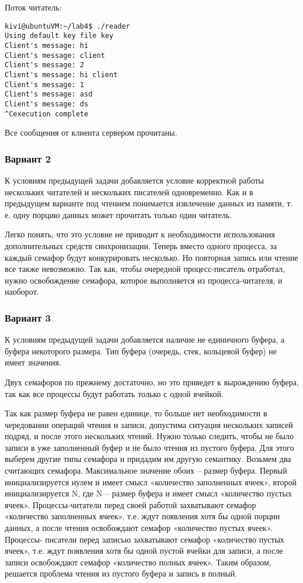 \documentclass[a4paper]{article}
\begin{document}
	Поток читатель:
	\begin{lstlisting}[style=crs_bash]
kivi@ubuntuVM:~/lab4$ ./reader 
Using default key file key
Client's message: hi
Client's message: client
Client's message: 2
Client's message: hi client
Client's message: 1
Client's message: asd
Client's message: ds
^Cexecution complete
	\end{lstlisting}
	
	Все сообщения от клиента сервером прочитаны.
	
	\subsubsection{Вариант 2}
	К условиям предыдущей задачи добавляется условие корректной работы нескольких читателей и нескольких писателей одновременно. Как и в предыдущем варианте под чтением понимается извлечение данных из памяти, т. е. одну порцию данных может прочитать только один читатель.

	Легко понять, что это условие не приводит к необходимости использования дополнительных средств синхронизации. Теперь вместо одного процесса, за каждый семафор будут конкурировать несколько. Но повторная запись или чтение все также невозможно. Так как, чтобы очередной процесс-писатель отработал, нужно освобождение семафора, которое выполняется из процесса-читателя, и наоборот.
	
	\subsubsection{Вариант 3}	
	К условиям предыдущей задачи добавляется наличие не единичного буфера, а буфера некоторого размера. Тип буфера (очередь, стек, кольцевой буфер) не имеет значения.
	
	Двух семафоров по прежнему достаточно, но это приведет к вырождению буфера, так как все процессы будут работать только с одной ячейкой.
	
	Так как размер буфера не равен единице, то больше нет необходимости в чередовании операций чтения и записи, допустима ситуация нескольких записей подряд, и после этого нескольких чтений. Нужно только следить, чтобы не было записи в уже заполненный буфер и не было чтения из пустого буфера. Для этого выберем другие типы семафора и придадим им другую семантику. Возьмем два считающих семафора. Максимальное значение обоих – размер буфера. Первый инициализируется нулем и имеет смысл «количество заполненных ячеек», второй инициализируется N, где N – размер буфера и имеет смысл «количество пустых ячеек». Процессы-читатели перед своей работой захватывают семафор «количество заполненных ячеек», т.е. ждут появления хотя бы одной порции данных, а после чтения освобождают семафор «количество пустых ячеек». Процессы- писатели перед записью захватывают семафор «количество пустых ячеек», т.е. ждут появления хотя бы одной пустой ячейки для записи, а после записи освобождают семафор «количество полных ячеек». Таким образом, решается проблема чтения из пустого буфера и запись в полный.
	
\end{document}
